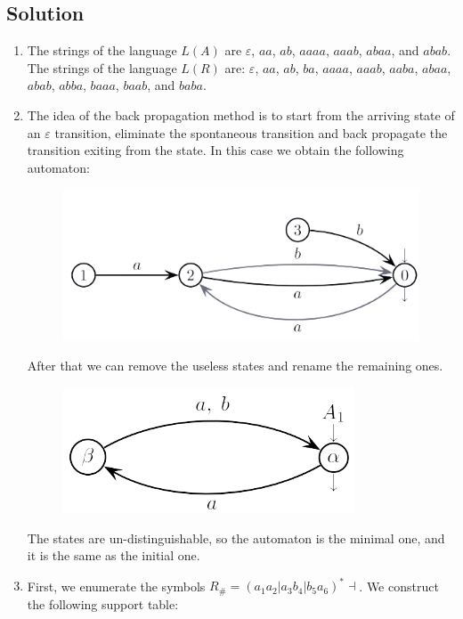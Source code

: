 \documentclass[12pt, a4paper]{report}
\newtheorem[style=M, bodystyle=\normalfont]{theorem}{Theorem}
\newtheorem[style=M, bodystyle=\normalfont]{corollary}{Corollary}
\newtheorem[style=M, bodystyle=\normalfont]{lemma}{Lemma}
\newtheorem[style=M, bodystyle=\normalfont]{definition}{Definition}
\begin{document}
    \subsection*{Solution}
        \begin{enumerate}
            \item The strings of the language $L(A)$ are $\varepsilon$, $aa$, $ab$, $aaaa$, $aaab$, $abaa$, and $abab$. 
                The strings of the language $L(R)$ are: $\varepsilon$, $aa$, $ab$, $ba$, $aaaa$, $aaab$, $aaba$, $abaa$, $abab$, $abba$, $baaa$, $baab$, and $baba$. 
            \item The idea of the back propagation method is to start from the arriving state of an $\varepsilon$ transition, eliminate the spontaneous transition and back propagate the transition exiting from the state.
                In this case we obtain the following automaton: 
                \begin{figure}[H]
                    \centering
                    \includegraphics[width=0.5\linewidth]{images/FSA2a.png}
                \end{figure}
                After that we can remove the useless states and rename the remaining ones. 
                \begin{figure}[H]
                    \centering
                    \includegraphics[width=0.5\linewidth]{images/FSA3a.png}
                \end{figure}
                The states are un-distinguishable, so the automaton is the minimal one, and it is the same as the initial one. 
            \item First, we enumerate the symbols $R_{\#}=\left( a_1a_2|a_3b_4|b_5a_6 \right)^{*}\dashv$. We construct the following support table: 
                \begin{table}[H]
                    \centering
                    \begin{tabular}{cc}

\end{tabular}
\end{table}
\end{enumerate}
\end{document}
